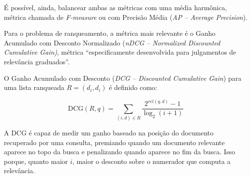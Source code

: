 \documentclass[
	12pt,				%
	openright,			%
	oneside,			%
	a4paper,			%
	english,			%
	french,				%
	spanish,			%
	brazil				%
	]{abntex2}
\begin{document}

É possível, ainda, balancear ambas as métricas com uma média harmônica, métrica chamada de \textit{F-measure} ou com Precisão Média (\textit{AP -- Average Precision}).

Para o problema de ranqueamento, a métrica mais relevante é o Ganho Acumulado com Desconto Normalizado (\textit{nDCG -- Normalized Discounted Cumulative Gain)}, métrica ``especificamente desenvolvida para julgamentos de relevância graduados''.\cite{}

O Ganho Acumulado com Desconto (\textit{DCG -- Discounted Cumulative Gain}) para uma lista ranqueada $R = {(d_i, d_i)}$ é definido como:

\begin{equation}
    \text{DCG}(R,q) = \sum_{(i,d)\in R}\frac{2^{rel(q,d)} - 1}{\log_{2}(i+1)}
\end{equation}

A DCG é capaz de medir um ganho baseado na posição do documento recuperado por uma consulta, premiando quando um documento relevante aparece no topo da busca e penalizando quando aparece no fim da busca.
Isso porque, quanto maior $i$, maior o desconto sobre o numerador que computa a relevância.
\end{document}
